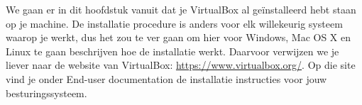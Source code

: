 We gaan er in dit hoofdstuk vanuit dat je VirtualBox al ge\"installeerd hebt staan op je machine. De installatie procedure is anders voor elk willekeurig systeem waarop je werkt, dus het zou te ver gaan om hier voor Windows, Mac OS X en Linux te gaan beschrijven hoe de installatie werkt. Daarvoor verwijzen we je liever naar de website van VirtualBox: \url{https://www.virtualbox.org/}. Op die site vind je onder End-user documentation de installatie instructies voor jouw besturingssysteem.
